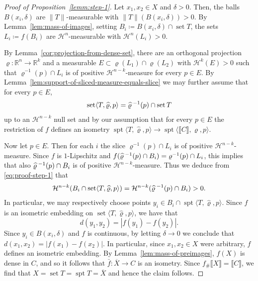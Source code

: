 \documentclass[reqno]{amsart}
\numberwithin{equation}{section}
\newcommand{\spt}{\operatorname{spt}}
\newcommand{\norm}[1]{\lVert#1\rVert}
\newcommand{\bb}[1]{\llbracket #1\rrbracket}
\DeclareMathOperator{\set}{set}
\renewcommand{\rho}{\varrho}
\begin{document}
\begin{proof}[Proof of Proposition~\ref{lemm:step-1}]
Let $x_1,x_2 \in X$ and $\delta>0$. Then, the balls $B(x_i,\delta)$ are  $\norm{T}$-measurable with $\norm{T}(B(x_i,\delta))>0$. By Lemma~\ref{lem:mass-of-images}, setting $B_i \coloneqq B(x_i,\delta)\cap \set T$, the sets $L_i \coloneqq f(B_i)$ are $\mathcal{H}^n$-measurable with $\mathcal{H}^n(L_i)>0$.

By Lemma~\ref{cor:projection-from-dense-set}, there are an orthogonal projection $\rho \colon \mathbb{R}^n\to\mathbb{R}^{k}$ and a measurable $E\subset \rho(L_1)\cap \rho(L_2)$ with $\mathcal{H}^{k}(E)>0$ such that $\rho^{-1}(p)\cap L_i$ is of positive $\mathcal{H}^{n-k}$-measure for every $p\in E$. By Lemma~\ref{lem:support-of-sliced-measure-equals-slice} we may further assume that for every $p\in E$, 
\begin{equation}
\label{eq:proof-step-1}
\set \langle T, \widehat{\rho},p\rangle = \widehat{\rho}^{\hspace{0.2em}-1}(p)\cap \set T
\end{equation}
up to an $\mathcal{H}^{n-k}$ null set and by our assumption that for every $p\in E$ the restriction of $f$ defines an isometry $\spt \langle T,\widehat{\rho}, p\rangle \to \spt \langle \bb{C},\rho,p\rangle$. 

Now let $p\in E$. Then for each $i$ the slice $\rho^{-1}(p)\cap L_i$ is of positive $\mathcal{H}^{n-k}$-measure. Since $f$ is $1$-Lipschitz and $f(\widehat{\rho}^{\hspace{0.2em}-1}(p)\cap B_i)=\rho^{-1}(p)\cap L_i$, this implies that also $\widehat{\rho}^{\hspace{0.2em}-1}(p)\cap B_i$ is of positive $\mathcal{H}^{n-k}$-measure. Thus we deduce from \eqref{eq:proof-step-1} that \[\mathcal{H}^{n-k}(B_i \cap \set \langle T, \widehat{\rho},p\rangle)= \mathcal{H}^{n-k}(\widehat{\rho}^{\hspace{0.2em}-1}(p)\cap B_i)>0.
\]
In particular, we may respectively choose points $y_i\in B_i\cap \spt \langle T, \widehat{\rho},p\rangle$. Since $f$ is an isometric embedding on $\set \langle T, \widehat{\rho},p\rangle$, we have that 
\[
d(y_1,y_2)=|f(y_1)-f(y_2)|.
\]
Since $y_i\in B(x_i,\delta)$ and $f$ is continuous, by letting $\delta\to 0$ we conclude that $d(x_1,x_2)=|f(x_1)-f(x_2)|$. In particular, since $x_1, x_2\in X$ were arbitrary, $f$ defines an isometric embedding. By Lemma~\ref{lem:mass-of-preimages}, $f(X)$ is dense in $C$, and so it follows that \(\bar{f} \colon \overline{X} \to C\) is an isometry. Since \(f_\# \bb{X}=\bb{C}\), we find that $X=\set T=\spt T=\overline{X}$ and hence the claim follows.
\end{proof}
\end{document}
